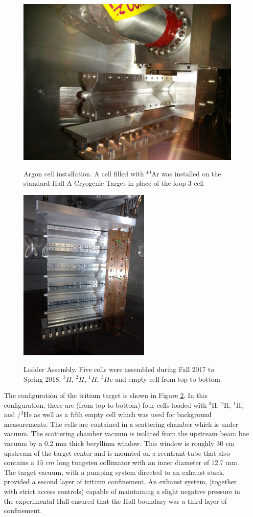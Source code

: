 \documentclass[final,5p,times,twocolumn]{elsarticle}
\begin{document}
\begin{figure}[htbp]
	\centering
	\includegraphics[width=6.5 cm]{images/Ar-cell.jpg}\\
	\caption{Argon cell installation. A cell filled with $^{40}$Ar was installed on the standard Hall A Cryogenic Target in place of the loop 3 cell}
	\label{argon}
\end{figure}

\begin{figure}[htbp]
  \centering
  \includegraphics[width=6.5cm]{images/ladder.jpg}\\
  \caption{Ladder Assembly. Five cells were assembled during Fall 2017 to Spring 2018, $^{3}H$, $^{2}H$, $^{1}H $, $^{3}He$ and empty cell from top to bottom}
  \label{ladder}
\end{figure}

The configuration of the tritium target is shown in Figure \ref{ladder}. In this configuration, there are (from top to bottom) four cells loaded with $^{3}$H, $^{2}$H, $^{1}$H, and /$^{3}$He as well as a fifth empty cell which was used for background measurements. The cells are contained in a scattering chamber which is under vacuum. The scattering chamber vacuum is isolated from the upstream beam line vacuum by a 0.2 mm thick beryllium window. This window is roughly 30 cm upstream of the target center and is mounted on a reentrant tube that also contains a $15$ $cm$ long tungsten collimator with an inner diameter of 12.7 mm. The target vacuum, with a pumping system directed to an exhaust stack, provided a second layer of tritium confinement. An exhaust system, (together with strict access controls) capable of maintaining a slight negative pressure in the experimental Hall ensured that the Hall boundary was a third layer of confinement.
\end{document}
